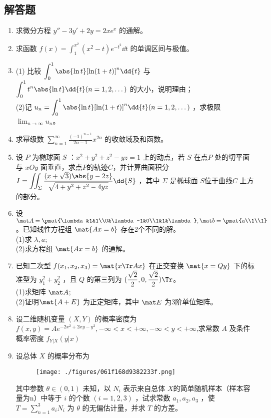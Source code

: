 \subsection{解答题}
\begin{enumerate}
\item 求微分方程 $y''-3y'+2y=2xe^x$ 的通解。
\item 求函数 $\displaystyle f(x)=\int_{1}^{x^2}(x^2-t)e^{-t^2}\dd{t}$ 的单调区间与极值。
\item (1) 比较 $\displaystyle \int_0^1 \abs{\ln t}[\ln (1+t)]^n\dd{t} $ 与  $\displaystyle \int_0^1 t^n \abs{\ln t}\dd{t} (n=1,2,\dots)$ 的大小，说明理由；\\
(2)记 $\displaystyle u_n= \int_0^1 \abs{\ln t}[\ln (1+t)]^n\dd{t} (n=1,2,\dots)$ ，求极限  $\displaystyle \lim_{n\to\infty} u_n$。
\item  求幂级数 $\displaystyle \sum_{n=1}^\infty \frac{(-1)^{n-1}}{2n-1}x^{2n}$ 的收敛域及和函数。
\item 设 $P$ 为椭球面 $S$ ：$x^2+y^2+z^2-yz=1$   上的动点，若 $S$ 在点$ P$ 处的切平面与 $xOy$ 面垂直，求点$P$的轨迹$C$，并计算曲面积分 $\displaystyle I=\iint_\Sigma \frac{(x+\sqrt{3})\abs{y-2z}}{\sqrt{4+y^2+z^2-4yz}}\dd{S}$  ，其中 $\Sigma$ 是椭球面  $S$位于曲线$ C$ 上方的部分。
\item 设 $\mat A=\pmat{\lambda &1&1\\0&\lambda-1&0\\1&1&\lambda},\mat b=\pmat{a\\1\\1}$  。已知线性方程组 $\mat {Ax=b}$ 存在2个不同的解。\\
(1)求 $\lambda,a$;\\
(2)求方程组 $\mat {Ax=b}$ 的通解。
\item 已知二次型 $f(x_1,x_2,x_3)=\mat {x \Tr Ax}$  在正交变换 $\mat {x=Qy}$ 下的标准型为 $y_1^2+y_2^2$  ，且 $Q$ 的第三列为 $\displaystyle (\frac{\sqrt{2}}{2},0,\frac{\sqrt{2}}{2})\Tr$。\\
(1)求矩阵  $\mat A$;\\
(2)证明$\mat{ A+E}$  为正定矩阵，其中 $\mat E$ 为3阶单位矩阵。
\item 设二维随机变量 $(X,Y)$ 的概率密度为 $\displaystyle f(x,y)=Ae^{-2x^2+2xy-y^2},-\infty<x<+\infty,-\infty<y<+\infty$,求常数 $A$ 及条件概率密度 $f_{Y|X}(y|x)$
\item 设总体 $X$ 的概率分布为
\begin{figure}[ht]
\centering
\texttt{[image: ./figures/061f168d9382233f.png]}
\caption{} \label{fig_PeeM10_1}
\end{figure}
其中参数 $\theta \in (0,1)$  未知，以 $N_i$ 表示来自总体 $X $的简单随机样本（样本容量为n）中等于 $i$ 的个数 $(i=1,2,3)$  ，试求常数  $a_1,a_2,a_3$  ，使  $\displaystyle T=\sum_{n=1}^3 a_iN_i$ 为 $\theta$  的无偏估计量，并求 $T$ 的方差。
\end{enumerate}